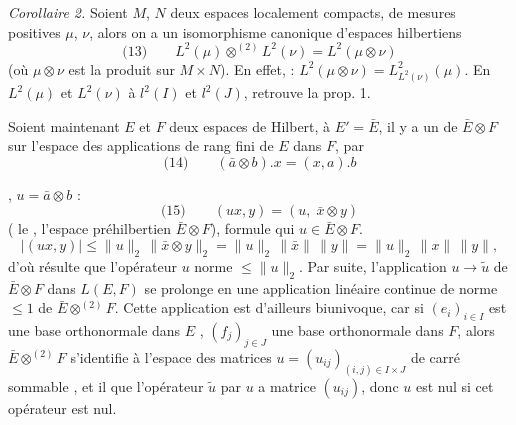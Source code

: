 \documentclass[11pt,a4paper]{article}
\begin{document}
\emph{Corollaire 2.} Soient $M$, $N$ deux espaces localement compacts,  de mesures positives $\mu$, $\nu$, alors on a un isomorphisme canonique d'espaces hilbertiens
\[
  \text{(13)}\qquad L^{2}(\mu) \otimes^{(2)} L^{2}(\nu) = L^{2}(\mu \otimes \nu)
\]
(où $\mu \otimes \nu$ est la  produit \ill{} sur $M \times N$). En effet,   : $L^{2}(\mu \otimes \nu) = L^{2}_{L^{2}(\nu)}(\mu)$. En  $L^{2}(\mu)$ et $L^{2}(\nu)$ à $l^{2}(I)$ et $l^{2}(J)$,  retrouve la prop. 1. \struck{\ill{}}

Soient maintenant $E$ et $F$ deux espaces de Hilbert, \ill{} \ill{} à $E' = \bar{E}$, \struck{\ill{}} il y a un   de $\bar{E} \otimes F$ sur l'espace des applications \struck{\ill{}}  de rang fini de $E$ dans $F$,  par
\[
  \text{(14)}\qquad (\bar{a} \otimes b).x = (x, a).b
\]

 \struck{\ill{}}       , \struck{\ill{}}  $u = \bar{a} \otimes b$ :
\[
  \text{(15)}\qquad (ux, y) = (u,\; \bar{x} \otimes y)
\]
( le  ,      \ill{}  l'espace préhilbertien $\bar{E} \otimes F$), formule qui     $u \in \bar{E} \otimes F$.    \struck{\ill{}}
\[
  |(ux, y)| \leq \|u\|_2\, \|\bar{x} \otimes y\|_2 = \|u\|_2\, \|\bar{x}\|\, \|y\| = \|u\|_2\, \|x\|\, \|y\|,
\]
d'où résulte que l'opérateur   $u$   norme $\leq \|u\|_2$. Par suite, l'application $u \to \tilde{u}$ de $\bar{E} \otimes F$ dans $L(E,F)$ se prolonge   en une application linéaire continue de  norme $\leq 1$ de $\bar{E} \otimes^{(2)} F$. Cette application est d'ailleurs biunivoque, car si $(e_i)_{i \in I}$ est une base orthonormale dans $E$ , $(f_j)_{j \in J}$ une base orthonormale dans $F$, alors $\bar{E} \otimes^{(2)} F$ s'identifie à l'espace \struck{\ill{}} des matrices  $u = (u_{ij})_{(i,j) \in I \times J}$   de carré sommable , et il  \struck{\ill{}}  que l'opérateur $\tilde{u}$  par $u$ a   matrice $(u_{ij})$, donc $u$ est nul si cet opérateur est nul. 
\end{document}
